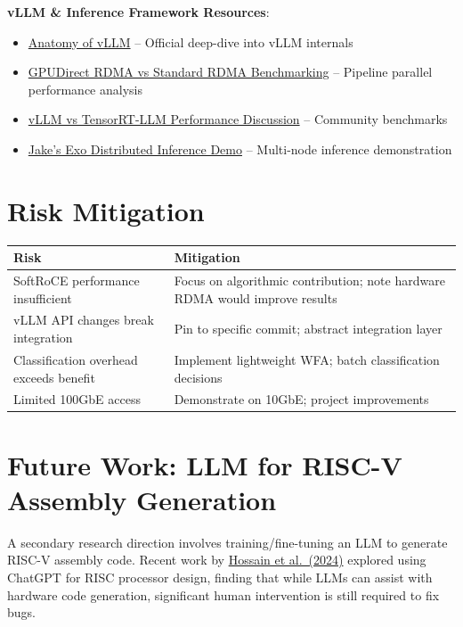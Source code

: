 \documentclass[10pt,letterpaper]{article}
\begin{document}
\textbf{vLLM \& Inference Framework Resources}:
\begin{itemize}[noitemsep]
    \item \href{https://blog.vllm.ai/2025/09/05/anatomy-of-vllm.html}{Anatomy of vLLM} -- Official deep-dive into vLLM internals
    \item \href{https://discuss.vllm.ai/t/vllm-benchmarking-why-is-gpudirect-rdma-not-outperforming-standard-rdma-in-a-pipeline-parallel-setup/1377}{GPUDirect RDMA vs Standard RDMA Benchmarking} -- Pipeline parallel performance analysis
    \item \href{https://www.reddit.com/r/LocalLLaMA/comments/1oyawkl/why_is_vllm_outperforming_tensorrtllm_nvidias/}{vLLM vs TensorRT-LLM Performance Discussion} -- Community benchmarks
    \item \href{https://www.reddit.com/r/LocalLLaMA/comments/1pq5k6e/jake_formerly_of_ltt_demonstrates_exos/}{Jake's Exo Distributed Inference Demo} -- Multi-node inference demonstration
\end{itemize}

\section{Risk Mitigation}

\begin{table}[h]
\centering
\small
\begin{tabular}{@{}p{4cm}p{5cm}@{}}
\toprule
\textbf{Risk} & \textbf{Mitigation} \\
\midrule
SoftRoCE performance insufficient & Focus on algorithmic contribution; note hardware RDMA would improve results \\
vLLM API changes break integration & Pin to specific commit; abstract integration layer \\
Classification overhead exceeds benefit & Implement lightweight WFA; batch classification decisions \\
Limited 100GbE access & Demonstrate on 10GbE; project improvements \\
\bottomrule
\end{tabular}
\end{table}

\section{Future Work: LLM for RISC-V Assembly Generation}

A secondary research direction involves training/fine-tuning an LLM to generate RISC-V assembly code. Recent work by \href{https://arxiv.org/abs/2401.10364}{Hossain et al.\ (2024)} explored using ChatGPT for RISC processor design, finding that while LLMs can assist with hardware code generation, significant human intervention is still required to fix bugs.
\end{document}
